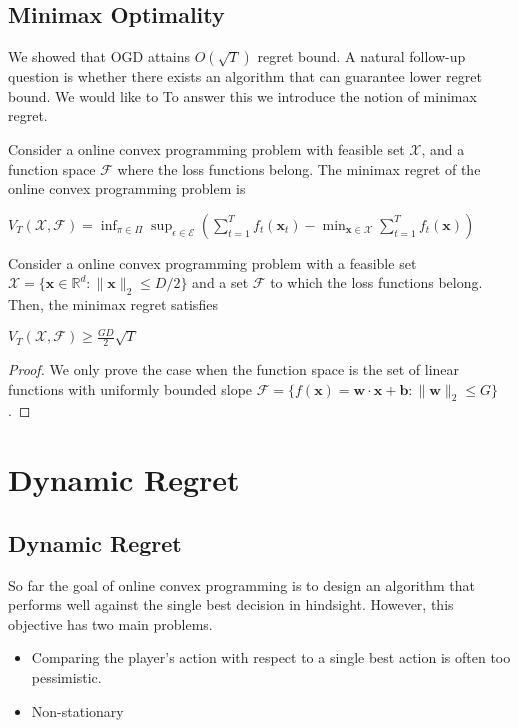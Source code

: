 \documentclass[12pt, a4paper]{report}
\begin{document}
\section{Minimax Optimality}
We showed that OGD attains $O(\sqrt{T})$ regret bound. A natural follow-up question is whether there exists an algorithm that can guarantee lower regret bound. We would like to  To answer this we introduce the notion of minimax regret.
\begin{defn} \label{def:minimax}
Consider a online convex programming problem with feasible set $\mathcal{X}$, and a function space $\mathcal{F}$ where the loss functions belong. The minimax regret of the online convex programming problem is
\begin{center}
    $\displaystyle V_T(\mathcal{X}, \mathcal{F}) = \inf_{\pi \in \Pi} \sup_{\epsilon \in \mathcal{E}} \left( \sum_{t=1}^{T} f_t(\mathbf{x}_t) - \min_{\mathbf{x} \in \mathcal{X}} \sum_{t=1}^{T} f_t(\mathbf{x}) \right)$
\end{center}
\end{defn}

\begin{prop}\cite[Theorem~4.2]{Abernethy2008OptimalSA}
Consider a online convex programming problem with a feasible set $\mathcal{X} = \{\mathbf{x} \in \mathbb{R}^d : \lVert \mathbf{x} \rVert_{2} \leq D/2\}$ and a set $\mathcal{F}$ to which the loss functions belong. Then, the minimax regret satisfies 
\begin{center}
    $V_T(\mathcal{X}, \mathcal{F}) \geq \frac{GD}{2}\sqrt{T}$
\end{center}
\end{prop}
\begin{proof}
We only prove the case when the function space is the set of linear functions with uniformly bounded slope $\mathcal{F} = \{f(\mathbf{x}) = \mathbf{w} \cdot \mathbf{x} + \mathbf{b}: \lVert \mathbf{w} \rVert_2 \leq G \}$.

\end{proof}
\chapter{Dynamic Regret}
\label{Chap3}
\section{Dynamic Regret}
So far the goal of online convex programming is to design an algorithm that performs well against the single best decision in hindsight. However, this objective has two main problems.
\begin{itemize}
    \item Comparing the player's action with respect to a single best action is often too pessimistic. 
    \item Non-stationary
\end{itemize}
\end{document}
